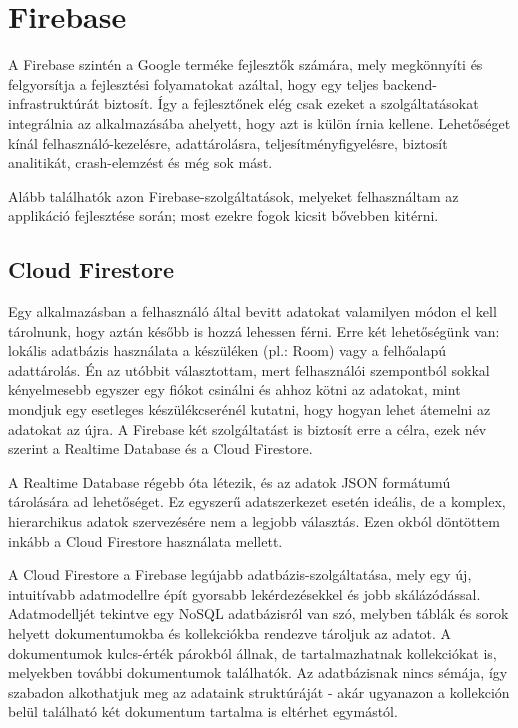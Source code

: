 \section{Firebase}

A Firebase szintén a Google terméke fejlesztők számára, mely megkönnyíti és felgyorsítja a fejlesztési folyamatokat azáltal, hogy egy teljes backend-infrastruktúrát biztosít. Így a fejlesztőnek elég csak ezeket a szolgáltatásokat integrálnia az alkalmazásába ahelyett, hogy azt is külön írnia kellene. Lehetőséget kínál felhasználó-kezelésre, adattárolásra, teljesítményfigyelésre, biztosít analitikát, crash-elemzést és még sok mást. 

Alább találhatók azon Firebase-szolgáltatások, melyeket felhasználtam az applikáció fejlesztése során; most ezekre fogok kicsit bővebben kitérni.

\subsection{Cloud Firestore}
Egy alkalmazásban a felhasználó által bevitt adatokat valamilyen módon el kell tárolnunk, hogy aztán később is hozzá lehessen férni. Erre két lehetőségünk van: lokális adatbázis használata a készüléken (pl.: Room) vagy a felhőalapú adattárolás. Én az utóbbit választottam, mert felhasználói szempontból sokkal kényelmesebb egyszer egy fiókot csinálni és ahhoz kötni az adatokat, mint mondjuk egy esetleges készülékcserénél kutatni, hogy hogyan lehet átemelni az adatokat az újra. A Firebase két szolgáltatást is biztosít erre a célra, ezek név szerint a Realtime Database és a Cloud Firestore. 

A Realtime Database régebb óta létezik, és az adatok JSON formátumú tárolására ad lehetőséget. Ez egyszerű adatszerkezet esetén ideális, de a komplex, hierarchikus adatok szervezésére nem a legjobb választás. Ezen okból döntöttem inkább a Cloud Firestore használata mellett. 

A Cloud Firestore a Firebase legújabb adatbázis-szolgáltatása, mely egy új, intuitívabb adatmodellre épít gyorsabb lekérdezésekkel és jobb skálázódással. \cite{RealtimevsFirestore} Adatmodelljét tekintve egy NoSQL adatbázisról van szó, melyben táblák és sorok helyett dokumentumokba és kollekciókba rendezve tároljuk az adatot. A dokumentumok kulcs-érték párokból állnak, de tartalmazhatnak kollekciókat is, melyekben további dokumentumok találhatók. \cite{FirestoreDataModel} Az adatbázisnak nincs sémája, így szabadon alkothatjuk meg az adataink struktúráját - akár ugyanazon a kollekción belül található két dokumentum tartalma is eltérhet egymástól. 

